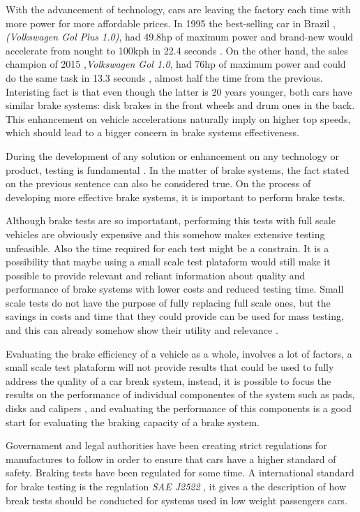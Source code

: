 	With the advancement of technology, cars are leaving the factory each time with more power for more affordable prices. In 1995 the best-selling car in Brazil \cite{lideres-vendas-brasil}, \textit{(Volkswagen Gol Plus 1.0)}, had 49.8hp of maximum power and brand-new would accelerate from nought to 100kph in 22.4 seconds \cite{cnwgol1993}. On the other hand, the sales champion of 2015 ,\textit{Volkswagen Gol 1.0}, had 76hp of maximum power and could do the same task in 13.3 seconds \cite{cnwgol2013}, almost half the time from the previous. Interisting fact is that even though the latter is 20 years younger, both cars have similar brake systems: disk brakes in the front wheels and drum ones in the back. This enhancement on vehicle accelerations naturally imply on higher top speeds, which should lead to a bigger concern in brake systems effectiveness.
	\par
	During the development of any solution or enhancement on any technology or product, testing is fundamental \cite{taguchi1986introduction}. In the matter of brake systems, the fact stated on the previous sentence can also be considered true. On the process of developing more effective brake systems, it is important to perform brake tests.
	\par
	Although brake tests are so importatant, performing this tests with full scale vehicles are obviously expensive and this somehow makes extensive testing unfeasible. Also the time required for each test might be a constrain. It is a possibility that maybe using a small scale test plataform would still make it possible to provide relevant and reliant information about quality and performance of brake systems with lower costs and reduced testing time. Small scale tests do not have the purpose of fully replacing full scale ones, but the savings in costs and time that they could provide can be used for mass testing, and this can already somehow show their utility and relevance \cite{gardinalli2005comparaccao}. 
	\par
	Evaluating the brake efficiency of a vehicle as a whole, involves a lot of factors, a small scale test plataform will not provide results that could be used to fully address the quality of a car break system, instead, it is possible to focus the results on the performance of individual componentes of the system such as pads, disks and calipers \cite{halderman2016automotive}, and evaluating the performance of this components is a good start for evaluating the braking capacity of a brake system.
	\par
	Governament and legal authorities have been creating strict regulations for manufactures to follow in order to ensure that cars have a higher standard of safety. Braking tests have been regulated for some time. A international standard for brake testing is the regulation \textit{SAE J2522} \cite{sae}, it gives a the description of how break tests should be conducted for systems used in low weight passengers cars.
